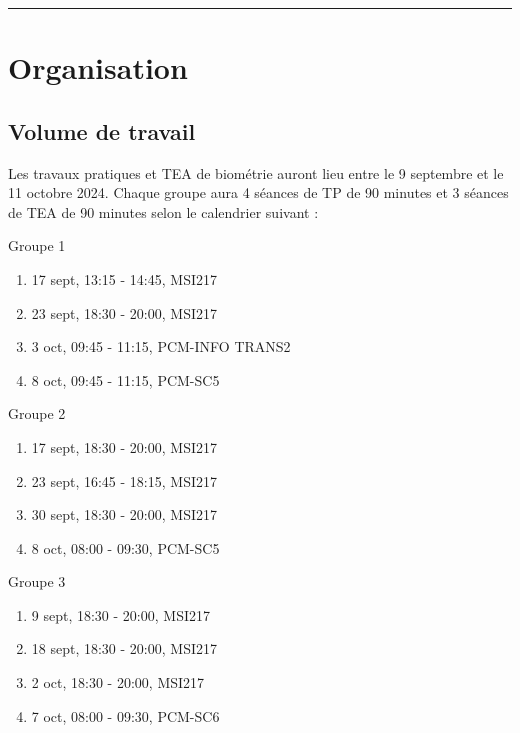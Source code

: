 \documentclass[
  a4paper,
  DIV=11,
  numbers=noendperiod,
  oneside]{scrreprt}
\providecommand{\tightlist}{%
  \setlength{\itemsep}{0pt}\setlength{\parskip}{0pt}}\usepackage{longtable,booktabs,array}
\begin{document}
\begin{center}\rule{0.5\linewidth}{0.5pt}\end{center}

\section*{Organisation}\label{organisation}


\subsection*{Volume de travail}\label{volume-de-travail}

Les travaux pratiques et TEA de biométrie auront lieu entre le 9
septembre et le 11 octobre 2024. Chaque groupe aura 4 séances de TP de
90 minutes et 3 séances de TEA de 90 minutes selon le calendrier suivant
:

Groupe 1

\begin{enumerate}
\def\labelenumi{\arabic{enumi}.}
\tightlist
\item
  17 sept, 13:15 - 14:45, MSI217
\item
  23 sept, 18:30 - 20:00, MSI217
\item
  3 oct, 09:45 - 11:15, PCM-INFO TRANS2
\item
  8 oct, 09:45 - 11:15, PCM-SC5
\end{enumerate}

Groupe 2

\begin{enumerate}
\def\labelenumi{\arabic{enumi}.}
\tightlist
\item
  17 sept, 18:30 - 20:00, MSI217
\item
  23 sept, 16:45 - 18:15, MSI217
\item
  30 sept, 18:30 - 20:00, MSI217
\item
  8 oct, 08:00 - 09:30, PCM-SC5
\end{enumerate}

Groupe 3

\begin{enumerate}
\def\labelenumi{\arabic{enumi}.}
\tightlist
\item
  9 sept, 18:30 - 20:00, MSI217
\item
  18 sept, 18:30 - 20:00, MSI217
\item
  2 oct, 18:30 - 20:00, MSI217
\item
  7 oct, 08:00 - 09:30, PCM-SC6
\end{enumerate}
\end{document}
